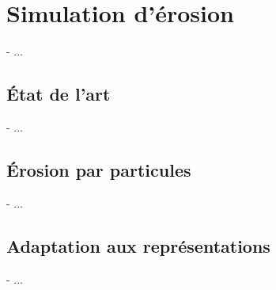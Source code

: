 \chapter{Simulation d'érosion}
\minitoc

- ...

\section{État de l'art}
- ...

\section{Érosion par particules}
- ...

\section{Adaptation aux représentations}
- ...
